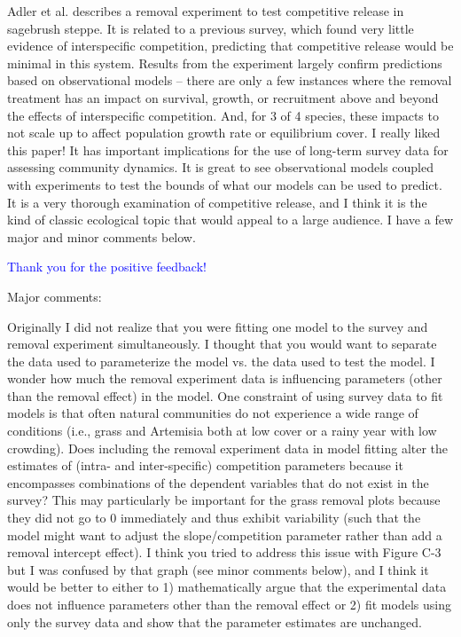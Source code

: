 \documentclass[12pt]{article}
\newcommand{\response}{\textcolor{blue}}
\begin{document}
Adler et al. describes a removal experiment to test competitive release in sagebrush steppe. It is related to a previous survey, which found very little evidence of interspecific competition, predicting that competitive release would be minimal in this system. Results from the experiment largely confirm predictions based on observational models – there are only a few instances where the removal treatment has an impact on survival, growth, or recruitment above and beyond the effects of interspecific competition. And, for 3 of 4 species, these impacts to not scale up to affect population growth rate or equilibrium cover. I really liked this paper! It has important implications for the use of long-term survey data for assessing community dynamics. It is great to see observational models coupled with experiments to test the bounds of what our models can be used to predict. It is a very thorough examination of competitive release, and I think it is the kind of classic ecological topic that would appeal to a large audience. I have a few major and minor comments below.

\response{Thank you for the positive feedback!}

Major comments:

Originally I did not realize that you were fitting one model to the survey and removal experiment simultaneously. I thought that you would want to separate the data used to parameterize the model vs. the data used to test the model.  I wonder how much the removal experiment data is influencing parameters (other than the removal effect) in the model. One constraint of using survey data to fit models is that often natural communities do not experience a wide range of conditions (i.e., grass and Artemisia both at low cover or a rainy year with low crowding). Does including the removal experiment data in model fitting alter the estimates of (intra- and inter-specific) competition parameters because it encompasses combinations of the dependent variables that do not exist in the survey? This may particularly be important for the grass removal plots because they did not go to 0 immediately and thus exhibit variability (such that the model might want to adjust the slope/competition parameter rather than add a removal intercept effect). I think you tried to address this issue with Figure C-3 but I was confused by that graph (see minor comments below), and I think it would be better to either to 1) mathematically argue that the experimental data does not influence parameters other than the removal effect or 2) fit models using only the survey data and show that the parameter estimates are unchanged. 
\end{document}

